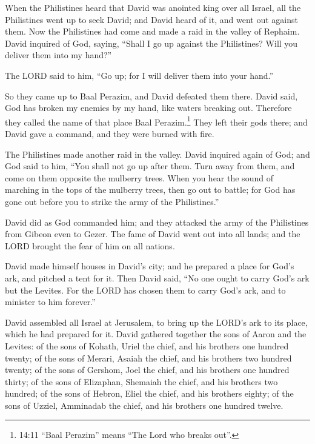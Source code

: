 \myverse{}When the Philistines heard that David was anointed king over all
Israel, all the Philistines went up to seek David; and David heard of it, and went out against them.
\myverse{}Now the Philistines had come and made a raid in the valley of Rephaim.
\myverse{}David inquired of God, saying, “Shall I go up against the Philistines? Will
you deliver them into my hand?”

The LORD said to him, “Go up; for I will deliver them into your hand.”

\myverse{}So they came up to Baal Perazim, and David defeated them there.
David said, God has broken my enemies by my hand, like waters breaking out. Therefore they called the
name of that place Baal Perazim.\footnote{14:11 “Baal Perazim” means “The Lord who breaks out”.}
\myverse{}They left their gods there; and David gave a command, and they were burned
with fire.

\myverse{}The Philistines made another raid in the valley.
\myverse{}David inquired again of God; and God said to him, “You shall not go up after
them. Turn away from them, and come on them opposite the mulberry trees.
\myverse{}When you hear the sound of marching in the tops of the mulberry trees, then
go out to battle; for God has gone out before you to strike the army of the Philistines.”

\myverse{}David did as God commanded him; and they attacked the army of
the Philistines from Gibeon even to Gezer.
\myverse{}The fame of David went out into all lands; and the LORD brought the fear
of him on all nations.


\mychapter{} \myverse*{}David made himself houses in David’s city; and he prepared a place
for God’s ark, and pitched a tent for it.
\myverse{}Then David said, “No one ought to carry God’s ark but the Levites. For the
LORD has chosen them to carry God’s ark, and to minister to him forever.”

\myverse{}David assembled all Israel at Jerusalem, to bring up the LORD’s
ark to its place, which he had prepared for it.
\myverse{}David gathered together the sons of Aaron and the Levites:
\myverse{}of the sons of Kohath, Uriel the chief, and his brothers one hundred twenty;
\myverse{}of the sons of Merari, Asaiah the chief, and his brothers two hundred twenty;
\myverse{}of the sons of Gershom, Joel the chief, and his brothers one hundred thirty;
\myverse{}of the sons of Elizaphan, Shemaiah the chief, and his brothers two hundred;
\myverse{}of the sons of Hebron, Eliel the chief, and his brothers eighty;
\myverse{}of the sons of Uzziel, Amminadab the chief, and his brothers one hundred
twelve.

